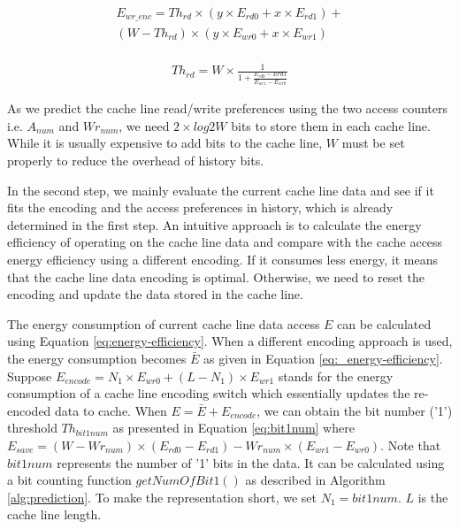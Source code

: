 \begin{equation}
    \label{eq:write_encoding_energy}
    \begin{split}
    E_{wr\_enc}=Th_{rd} \times (y \times E_{rd0} + x \times E_{rd1}) + \\ (W - Th_{rd}) \times (y \times E_{wr0} + x \times E_{wr1}) \\
    \end{split}
\end{equation}

\begin{equation}
\label{eq:threshold}
    \begin{split}
    Th_{rd} = W \times \frac{1}{1 + \frac{E_{rd0} - E{rd1}}{E_{wr1}-E_{wr0}}}
    \end{split}
\end{equation}
\normalsize

As we predict the cache line read/write preferences using the two access 
counters i.e. $A_{num}$ and $Wr_{num}$, we need $2\times log{2}{W}$ 
bits to store them in each cache line. While it is usually expensive 
to add bits to the cache line, $W$ must be set properly to 
reduce the overhead of history bits.

In the second step, we mainly evaluate the current cache line data
and see if it fits the encoding and the access preferences in history, 
which is already determined in the first step. An intuitive approach 
is to calculate the energy efficiency of operating on the cache line 
data and compare with the cache access energy efficiency using a 
different encoding. If it consumes less energy, it means that the cache 
line data encoding is optimal. Otherwise, we need to reset the encoding 
and update the data stored in the cache line. 

The energy consumption of current cache line data access $E$ can be 
calculated using Equation \ref{eq:energy-efficiency}.
When a different encoding approach is used, the energy consumption 
becomes $\bar{E}$ as given in Equation \ref{eq:_energy-efficiency}.
Suppose $E_{encode}=N_{1} \times E_{wr0} + (L - N_{1}) \times E_{wr1}$ stands for the energy consumption of a cache 
line encoding switch which essentially updates the re-encoded data to cache.
When $E = \bar{E} + E_{encode}$, we can obtain the bit number ('1') threshold 
$Th_{bit1num}$ as presented in Equation \ref{eq:bit1num} 
where $E_{save} = (W-Wr_{num}) \times (E_{rd0}-E_{rd1}) - Wr_{num}\times(E_{wr1}-E_{wr0})$. 
Note that $bit1num$ represents the number of '1' bits in the data. 
It can be calculated using a bit counting function $getNumOfBit1()$ as described in 
Algorithm \ref{alg:prediction}. To make the representation short, 
we set $N_{1} = bit1num$. $L$ is the cache line length.

